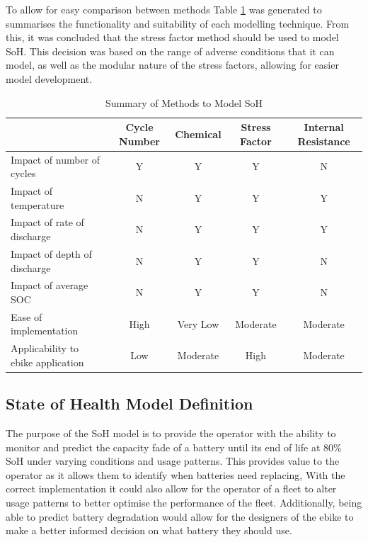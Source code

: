 \documentclass[a4paper, 10pt]{article}
\numberwithin{equation}{section}
\begin{document}
To allow for easy comparison between methods Table \ref{tab:SoH_summary} was generated to 
summarises the functionality and suitability of each modelling technique. From this, it was concluded that the stress factor method should be used to model SoH. This decision was based on the range of adverse conditions that it can model, as well as the modular nature of the stress factors, allowing for easier model development.

\begin{table}[H]
\caption{Summary of Methods to Model SoH}
\centering
\begin{tabular}{|l|c|c|c|c|}
\hline
 & \textbf{Cycle Number} & \textbf{Chemical} & \textbf{Stress Factor} & \textbf{Internal Resistance} \\ \hline
Impact of number of cycles  & Y & Y &Y  & N  \\ \hline
Impact of temperature  & N & Y & Y & Y     \\\hline
Impact of rate of discharge & N & Y & Y & Y  \\\hline
Impact of depth of discharge  & N & Y & Y & N  \\\hline
Impact of average SOC  & N & Y & Y & N       \\\hline
Ease of implementation  & High  & Very Low  & Moderate &   Moderate  \\\hline
Applicability to ebike application & Low & Moderate & High &     Moderate 
\\\hline
\end{tabular}
\label{tab:SoH_summary}
\end{table}

\subsection{State of Health Model Definition}

The purpose of the SoH model is to provide the operator with the ability to monitor and predict the capacity fade of a battery until its end of life at $80\%$ SoH under varying conditions and usage patterns. This provides value to the operator as it allows them to identify when batteries need replacing, With the correct implementation it could also allow for the operator of a fleet to alter usage patterns to better optimise the performance of the fleet. Additionally, being able to predict battery degradation would allow for the designers of the ebike to make a better informed decision on what battery they should use.
\end{document}
